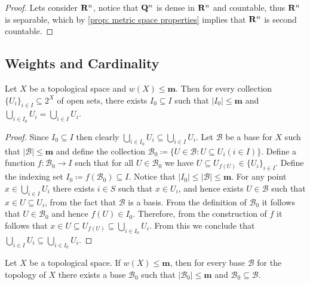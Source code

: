 \begin{proof}
Lets consider \(\mathbf{R}^n\), notice that \(\mathbf{Q}^n\) is dense in \(\mathbf{R}^n\) and countable,
thus \(\mathbf{R}^n\) is separable, which by \cref{prop: metric space properties}
implies that \(\mathbf{R}^n\) is second countable.
\end{proof}

\subsection{Weights and Cardinality}

\begin{proposition}\label{prop: weight m space subset union}
Let \(X\) be a topological space and \(w(X) \leq \mathbf m\). Then for every
collection \(\{U_i\}_{i \in I} \subseteq 2^X\) of open sets, there exists
\(I_0 \subseteq I\) such that \(|I_0| \leq \mathbf m\) and \(\bigcup_{i \in
I_0} U_i = \bigcup_{i \in  I} U_i\).
\end{proposition}

\begin{proof}
Since \(I_0 \subseteq I\) then clearly \(\bigcup_{i \in  I_0} U_i \subseteq
\bigcup_{i \in  I} U_i\). Let \(\mathcal B\) be a base for \(X\) such that
\(|\mathcal B| \leq \mathbf m\) and define the collection \(\mathcal B_0 \coloneq
\{U \in \mathcal B \colon U \subseteq U_i (i \in I)\}\). Define a function \(f:
\mathcal B_0 \to I\) such that for all \(U \in \mathcal B_0\) we have \(U
\subseteq  U_{f(U)} \in \{U_i\}_{i \in I}\). Define the indexing set \(I_0 \coloneq
f(\mathcal B_0) \subseteq I\). Notice that \(|I_0| \leq |\mathcal B| \leq
\mathbf m\). For any point \(x \in \bigcup_{i \in  I} U_i\) there exists \(i
\in S\) such that \(x \in U_i\), and hence exists \(U \in \mathcal B\) such
that \(x \in U \subseteq U_i\), from the fact that \(\mathcal B\) is a basis.
From the definition of \(\mathcal B_0\) it follows that \(U \in \mathcal B_0\)
and hence \(f(U) \in I_0\). Therefore, from the construction of \(f\) it
follows that \(x \in U \subseteq U_{f(U)} \subseteq \bigcup_{i \in  I_0}
U_i\). From this we conclude that \(\bigcup_{i \in  I} U_i \subseteq
\bigcup_{i \in  I_0} U_i\).
\end{proof}

\begin{proposition}
Let \(X\) be a topological space. If \(w(X) \leq \mathbf m\), then for every base
\(\mathcal B\) for the topology of \(X\) there exists a base \(\mathcal B_0\)
such that \(|\mathcal B_0| \leq \mathbf m\) and \(\mathcal B_0 \subseteq
\mathcal B\).
\end{proposition}


